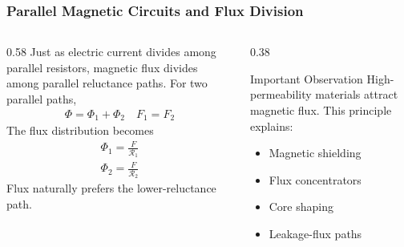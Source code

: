 \begin{frame} 
    \frametitle{Parallel Magnetic Circuits and Flux Division} 
    \begin{columns} 
        \begin{column}{0.58\textwidth} 
            Just as electric current divides among parallel resistors, magnetic flux divides among parallel reluctance paths. 
            \vspace{0.15cm} 
            For two parallel paths, 
            \begin{align} 
                \Phi = \Phi_1+\Phi_2 \quad F_1=F_2 
            \end{align}
            The flux distribution becomes 
            \begin{align} 
                \Phi_1 = \frac{F}{\mathcal R_1} 
            \end{align} 
            \begin{align} 
                \Phi_2 = \frac{F}{\mathcal R_2} 
            \end{align} 
            Flux naturally prefers the lower-reluctance path. 
        \end{column} 
        \begin{column}{0.38\textwidth} 
            \begin{block}{Important Observation} 
                High-permeability materials attract magnetic flux. 
                This principle explains: 
                \begin{itemize} 
                    \item Magnetic shielding 
                    \item Flux concentrators 
                    \item Core shaping 
                    \item Leakage-flux paths 
                \end{itemize} 
            \end{block} 
        \end{column} 
    \end{columns} 
\end{frame}


